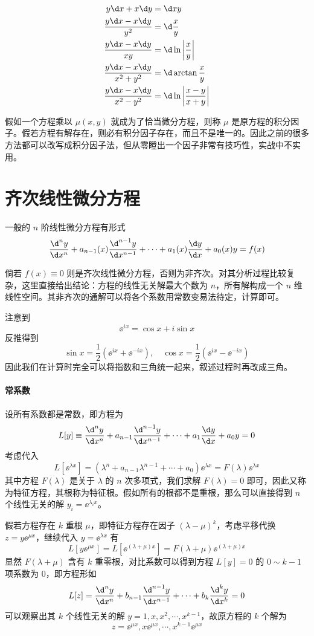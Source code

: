 \[ \begin{aligned}
		y \d x + x \d y                   & = \d x y                              \\
		\frac{y \d x - x \d y}{y^2}       & = \d \frac{x}{y}                      \\
		\frac{y \d x - x \d y}{xy}        & = \d \ln\left|\frac{x}{y}\right|      \\
		\frac{y \d x - x \d y}{x^2 + y^2} & = \d \arctan \frac{x}{y}              \\
		\frac{y \d x - x \d y}{x^2 - y^2} & = \d \ln\left| \frac{x-y}{x+y}\right| \\
	\end{aligned} \]

假如一个方程乘以 $\mu(x, y)$ 就成为了恰当微分方程，则称 $\mu$ 是原方程的积分因子。假若方程有解存在，则必有积分因子存在，而且不是唯一的。因此之前的很多方法都可以改写成积分因子法，但从零瞪出一个因子非常有技巧性，实战中不实用。

\section{齐次线性微分方程}

一般的 $n$ 阶线性微分方程有形式
\[ \frac{\d^n y}{\d x^n} + a_{n-1}(x) \frac{\d^{n-1} y}{\d x^{n-1}} + \cdots + a_1(x) \frac{\d y}{\d x} + a_0(x) y = f(x) \]

倘若 $f(x) \equiv 0$ 则是齐次线性微分方程，否则为非齐次。对其分析过程比较复杂，这里直接给出结论：方程的线性无关解最大个数为 $n$，所有解构成一个 $n$ 维线性空间。其非齐次的通解可以将各个系数用常数变易法待定，计算即可。

注意到
\[ \ee^{i x} = \cos x + i \sin x \]
反推得到
\[ \sin x = \frac{1}{2}(\ee^{i x} + \ee^{-i x}), \quad \cos x = \frac{1}{2} (\ee^{ix} - \ee^{-ix}) \]
因此我们在计算时完全可以将指数和三角统一起来，叙述过程时再改成三角。

\paragraph{常系数}

设所有系数都是常数，即方程为
\[ L[y] \equiv \frac{\d^n y}{\d x^n} + a_{n-1} \frac{\d^{n-1} y}{\d x^{n-1}} + \cdots + a_1 \frac{\d y}{\d x} + a_0 y = 0 \]
考虑代入
\[ L[\ee^{\lambda x}] = (\lambda^n + a_{n-1} \lambda^{n-1} + \cdots + a_0) \ee^{\lambda x} = F(\lambda) \ee^{\lambda x} \]
其中方程 $F(\lambda)$ 是关于 $\lambda$ 的 $n$ 次多项式，我们求解 $F(\lambda) = 0$ 即可，因此又称为特征方程，其根称为特征根。假如所有的根都不是重根，那么可以直接得到 $n$ 个线性无关的解 $y_i = \ee^{\lambda_i x}$。

假若方程存在 $k$ 重根 $\mu$，即特征方程存在因子 $(\lambda - \mu)^k$，考虑平移代换 $z = y \ee^{\mu x}$，继续代入 $y = \ee^{\lambda x}$ 有
\[ L[y \ee^{\mu x}] = L[\ee^{(\lambda + \mu) x}] = F(\lambda + \mu) \ee^{(\lambda + \mu) x} \]
显然 $F(\lambda + \mu)$ 含有 $k$ 重零根，对比系数可以得到方程 $L[y] = 0$ 的 $0 \sim k-1$ 项系数为 $0$，即方程形如
\[ L[z] = \frac{\d^n y}{\d x^n} + b_{n-1} \frac{\d^{n-1} y}{\d x^{n-1}} + \cdots + b_{k} \frac{\d^k y}{\d x^k} = 0 \]
可以观察出其 $k$ 个线性无关的解 $y = 1, x, x^2, \cdots, x^{k-1}$，故原方程的 $k$ 个解为
\[ z = \ee^{\mu x}, x \ee^{\mu x}, \cdots, x^{k-1} \ee^{\mu x} \]
